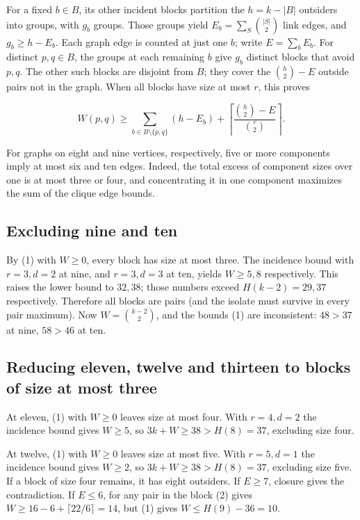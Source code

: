 \documentclass[
  11pt,
]{article}
\begin{document}
For a fixed \(b\in B\), its other incident blocks partition the
\(h=k-|B|\) outsiders into groups, with \(g_b\) groups. Those groups
yield \(E_b=\sum_S\binom{|S|}{2}\) link edges, and \(g_b\ge h-E_b\).
Each graph edge is counted at just one \(b\); write \(E=\sum_b E_b\).
For distinct \(p,q\in B\), the groups at each remaining \(b\) give
\(g_b\) distinct blocks that avoid \(p,q\). The other such blocks are
disjoint from \(B\); they cover the \(\binom h2-E\) outside pairs not in
the graph. When all blocks have size at most \(r\), this proves

\[
 W(p,q)\ge \sum_{b\in B\setminus\{p,q\}}(h-E_b)
           +\left\lceil\frac{\binom h2-E}{\binom r2}\right\rceil .
 \tag{2}
\]

For graphs on eight and nine vertices, respectively, five or more
components imply at most six and ten edges. Indeed, the total excess of
component sizes over one is at most three or four, and concentrating it
in one component maximizes the sum of the clique edge bounds.

\subsection{Excluding nine and ten}\label{excluding-nine-and-ten}

By (1) with \(W\ge 0\), every block has size at most three. The
incidence bound with \(r=3,d=2\) at nine, and \(r=3,d=3\) at ten, yields
\(W\ge 5,8\) respectively. This raises the lower bound to \(32,38\);
those numbers exceed \(H(k-2)=29,37\) respectively. Therefore all blocks
are pairs (and the isolate must survive in every pair maximum). Now
\(W=\binom{k-2}{2}\), and the bounds (1) are inconsistent: \(48>37\) at
nine, \(58>46\) at ten.

\subsection{Reducing eleven, twelve and thirteen to blocks of size at
most
three}\label{reducing-eleven-twelve-and-thirteen-to-blocks-of-size-at-most-three}

At eleven, (1) with \(W\ge 0\) leaves size at most four. With
\(r=4,d=2\) the incidence bound gives \(W\ge 5\), so
\(3k+W\ge 38>H(8)=37\), excluding size four.

At twelve, (1) with \(W\ge 0\) leaves size at most five. With
\(r=5,d=1\) the incidence bound gives \(W\ge 2\), so
\(3k+W\ge 38>H(8)=37\), excluding size five. If a block of size four
remains, it has eight outsiders. If \(E\ge 7\), closure gives the
contradiction. If \(E\le 6\), for any pair in the block (2) gives
\(W\ge 16-6+\lceil 22/6\rceil=14\), but (1) gives \(W\le H(9)-36=10\).
\end{document}
